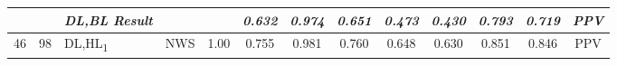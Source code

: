 \begin{table}[H]
{\begin{tabular}{cc|l|cc|c|c|c|c|c|c|c|c|}
   &
    \textit{\textbf{}} &
    \textit{\textbf{DL,BL Result}} &
     &
     &
    \textit{\textbf{0.632}} &
    \textit{\textbf{0.974}} &
    \textit{\textbf{0.651}} &
    \textit{\textbf{0.473}} &
    \textit{\textbf{0.430}} &
    \textit{\textbf{0.793}} &
    \textit{\textbf{0.719}} &
    \textit{\textbf{PPV}} \\ \hline
  \multicolumn{1}{|c|}{46} &
    98 &
    DL,HL\textsubscript{1} &
    \multicolumn{1}{c|}{NWS} &
    1.00 &
    0.755 &
    0.981 &
    0.760 &
    0.648 &
    0.630 &
    0.851 &
    0.846 &
    PPV \\ \hline  
  \end{tabular}%
  }
  \end{table}


